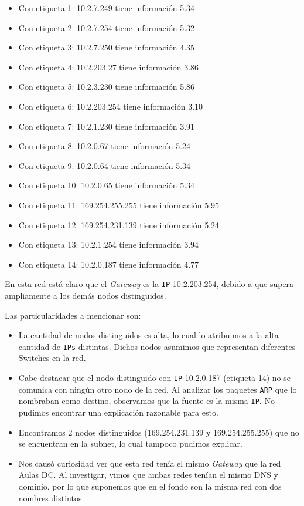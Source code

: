 \begin{itemize}
    \item Con etiqueta 1: 10.2.7.249 tiene información 5.34
    \item Con etiqueta 2: 10.2.7.254 tiene información 5.32
    \item Con etiqueta 3: 10.2.7.250 tiene información 4.35
    \item Con etiqueta 4: 10.2.203.27 tiene información 3.86
    \item Con etiqueta 5: 10.2.3.230 tiene información 5.86
    \item Con etiqueta 6: 10.2.203.254 tiene información 3.10
    \item Con etiqueta 7: 10.2.1.230 tiene información 3.91
    \item Con etiqueta 8: 10.2.0.67 tiene información 5.24
    \item Con etiqueta 9: 10.2.0.64 tiene información 5.34
    \item Con etiqueta 10: 10.2.0.65 tiene información 5.34
    \item Con etiqueta 11: 169.254.255.255 tiene información 5.95
    \item Con etiqueta 12: 169.254.231.139 tiene información 5.24
    \item Con etiqueta 13: 10.2.1.254 tiene información 3.94
    \item Con etiqueta 14: 10.2.0.187 tiene información 4.77
\end{itemize}

En esta red está claro que el \textit{Gateway} es la \texttt{IP} 10.2.203.254, debido a que
supera ampliamente a los demás nodos distinguidos.

Las particularidades a mencionar son:
\begin{itemize}
    \item La cantidad de nodos distinguidos es alta, lo cual lo atribuimos a la alta
        cantidad de \texttt{IPs} distintas.
        Dichos nodos asumimos que representan diferentes Switches en la red.
    \item Cabe destacar que el nodo distinguido con \texttt{IP} 10.2.0.187 (etiqueta 14)
        no se comunica con ningún otro nodo de la red. Al analizar los paquetes \texttt{ARP} que lo nombraban como
        destino, observamos que la fuente es la misma \texttt{IP}. No pudimos encontrar una explicación razonable para
        esto.
    \item Encontramos 2 nodos distinguidos (169.254.231.139 y 169.254.255.255) que no
        se encuentran en la subnet, lo cual tampoco pudimos explicar.
    \item Nos causó curiosidad ver que esta red tenía el mismo \textit{Gateway} que la red
        Aulas DC. Al investigar, vimos que ambas redes tenían el mismo DNS y dominio, por lo que suponemos
        que en el fondo son la misma red con dos nombres distintos.
\end{itemize}

